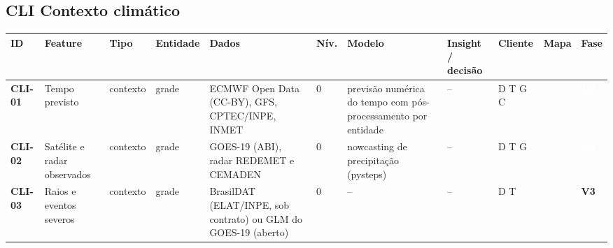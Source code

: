 \subsection*{CLI \textperiodcentered{} Contexto climático}
\label{cat:CLI}
{\footnotesize\setlength{\tabcolsep}{3pt}
\begin{longtable}{@{}P{1.35cm}P{4.1cm}P{1.3cm}P{3.1cm}P{3.7cm}C{0.6cm}P{3.6cm}P{3.3cm}P{1.1cm}P{0.9cm}P{1.1cm}@{}}
\toprule
\textbf{ID} & \textbf{Feature} & \textbf{Tipo} & \textbf{Entidade} & \textbf{Dados} & \textbf{Nív.} & \textbf{Modelo} & \textbf{Insight / decisão} & \textbf{Cliente} & \textbf{Mapa} & \textbf{Fase} \\
\midrule\endhead
\textbf{CLI-01} & Tempo previsto & contexto & grade & ECMWF Open Data (CC-BY), GFS, CPTEC/INPE, INMET & 0 & previsão numérica do tempo com pós-processamento por entidade & -- & D T G C &  & \colorbox{fV2}{\scriptsize \textcolor{white}{\textbf{V2}}} \\
\textbf{CLI-02} & Satélite e radar observados & contexto & grade & GOES-19 (ABI), radar REDEMET e CEMADEN & 0 & nowcasting de precipitação (pysteps) & -- & D T G &  & \colorbox{fV2}{\scriptsize \textcolor{white}{\textbf{V2}}} \\
\textbf{CLI-03} & Raios e eventos severos & contexto & grade & BrasilDAT (ELAT/INPE, sob contrato) ou GLM do GOES-19 (aberto) & 0 & -- & -- & D T &  & \colorbox{fV3}{\scriptsize \textbf{V3}} \\
\bottomrule
\end{longtable}}

